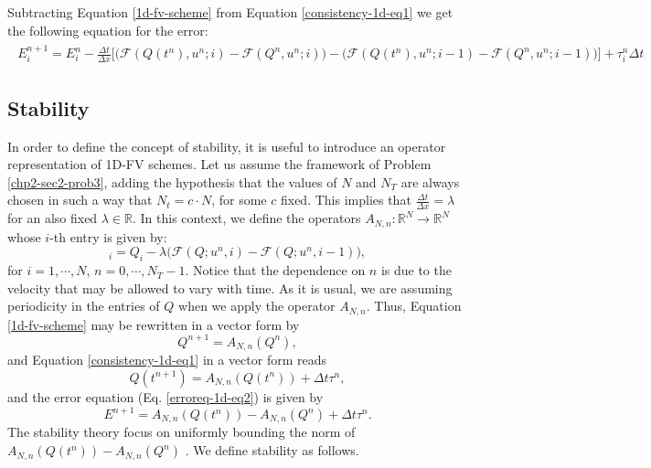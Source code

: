 Subtracting Equation \eqref{1d-fv-scheme} from Equation \eqref{consistency-1d-eq1} we get
the following equation for the error:
\begin{align}
	\begin{split}
	\label{erroreq-1d-eq2}
		E^{n+1}_i = E^n_i -
		\frac{\Delta t}{\Delta x} 
		\bigg[
			\bigg(\mathcal{F}(Q(t^n),u^n;i) - \mathcal{F}(Q^n,u^n;i) \bigg) -
			\bigg( \mathcal{F}(Q(t^n),u^n;i-1) -  \mathcal{F}(Q^n,u^n;i-1) \bigg)
		\bigg] 
		+ \tau_{i}^n \Delta t 
	\end{split}
\end{align}

\subsection{Stability}
In order to define the concept of stability, it is useful to introduce an operator
representation of 1D-FV schemes.
Let us assume the framework of Problem \ref{chp2-sec2-prob3},
adding the hypothesis that the values of $N$ and $N_T$ are always chosen in such a way
that $N_t = c \cdot N $, for some $c$ fixed. This implies that $\frac{\Delta t}{\Delta x} = \lambda$
for an also fixed $\lambda \in \mathbb{R}$.
In this context, we define the operators
$A_{N,n}: \mathbb{R}^N \to \mathbb{R}^N$ whose $i$-th entry is given by:
\begin{equation}
	[A_{N,n}(Q)]_i = Q_i -\lambda \bigg( \mathcal{F}(Q;u^n,i) - \mathcal{F}(Q;u^n,i-1) \bigg),
\end{equation}
for $i=1, \cdots, N$, $n=0, \cdots, N_T-1$.
Notice that the dependence on $n$ is due to the velocity that may be allowed
to vary with time.
As it is usual, we are assuming periodicity in the entries of $Q$ when 
we apply the operator $A_{N,n}$.
Thus, Equation \eqref{1d-fv-scheme} may be rewritten in a vector form by
\begin{equation*}
	Q^{n+1} = A_{N,n}(Q^n),
\end{equation*}
and Equation \eqref{consistency-1d-eq1} in a vector form reads
\begin{equation*}
	Q(t^{n+1}) = A_{N,n}(Q(t^n)) + \Delta t \tau^n,
\end{equation*}
and the error equation (Eq. \eqref{erroreq-1d-eq2}) is given by
\begin{equation}
	\label{erroreq-1d-eq3}
	E^{n+1} = A_{N,n}(Q(t^n)) - A_{N,n}(Q^n) +  \Delta t \tau^n.
\end{equation}
The stability theory focus on uniformly bounding the norm of $A_{N,n}(Q(t^n)) - A_{N,n}(Q^n)$ \citep{leveque:2002}.
We define stability as follows.

